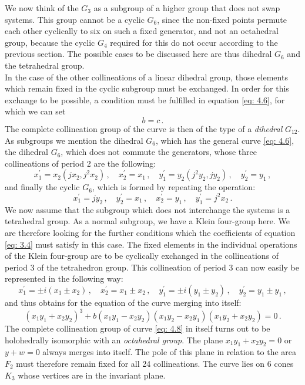 \documentclass[leqno]{article}
\begin{document}
We now think of the $G_3$ as a subgroup of a higher group that does not swap systems. This group cannot be a cyclic $G_6$, since the non-fixed points permute each other cyclically to six on such a fixed generator, and not an octahedral group, because the cyclic $G_4$ required for this do not occur according to the previous section. The possible cases to be discussed here are thus dihedral $G_6$ and the tetrahedral group. \\
In the case of the other collineations of a linear dihedral group, those elements which remain fixed in the cyclic subgroup must be exchanged. In order for this exchange to be possible, a condition must be fulfilled in equation \eqref{eq: 4.6}, for which we can set 
\begin{equation}\label{eq: 4.7}
b=c \, . \tag{7}
\end{equation}
The complete collineation group of the curve is then of the type of a \textit{dihedral} $G_{12}$. As subgroups we mention the dihedral $G_6$, which has the general curve \eqref{eq: 4.6}, the dihedral $G_6$, which does not commute the generators, whose three collineations of period 2 are the following: 
\[
x_1^\prime = x_2( jx_2, j^2 x_2) \, , \quad x_2^\prime = x_1 \, , \quad y_1^\prime = y_2(j^2 y_2, j y_2) \, , \quad y_2^\prime = y_1 \, , 
\] 
and finally the cyclic $G_6$, which is formed by repeating the operation: 
\[
x_1^\prime = j y_2 \, , \quad y_2^\prime = x_1 \, , \quad x_2^\prime = y_1 \, , \quad y_1^\prime = j^2 x_2 \, . 
\]
We now assume that the subgroup which does not interchange the systems is a tetrahedral group. As a normal subgroup, we have a Klein four-group here. We are therefore looking for the further conditions which the coefficients of equation \eqref{eq: 3.4} must satisfy in this case. The fixed elements in the individual operations of the Klein four-group are to be cyclically exchanged in the collineations of period 3 of the tetrahedron group. This collineation of period 3 can now easily be represented in the following way:
\[
x_1^\prime = \pm i(x_1 \pm x_2) \, , \quad x_2^\prime = x_1 \pm x_2 \, , \quad y_1^\prime = \pm i (y_1 \pm y_2) \, , \quad y_2^\prime = y_1 \pm y_1 \, , 
\]
and thus obtains for the equation of the curve merging into itself:
\begin{equation}\label{eq: 4.8}
(x_1 y_1 + x_2 y_2)^3 + b(x_1 y_1 - x_2 y_2) (x_1 y_2 - x_2 y_1)( x_1 y_2 + x_2 y_2) = 0 \, . \tag{8}
\end{equation}
The complete collineation group of curve \eqref{eq: 4.8} in itself turns out to be holohedrally isomorphic with an \textit{octahedral group}. The plane $x_1 y_1 + x_2 y_2 = 0$ or $y+w=0$ always merges into itself. The pole of this plane in relation to the area $F_2$ must therefore remain fixed for all 24 collineations. The curve lies on 6 cones $K_3$ whose vertices are in the invariant plane.
\end{document}
